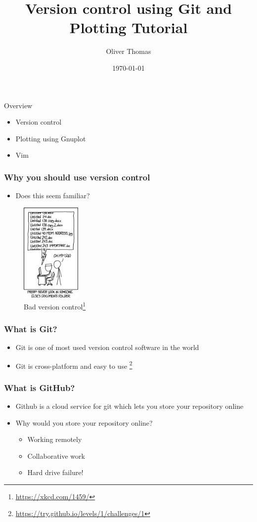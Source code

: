\documentclass{beamer}
\title{Version control using Git and Plotting Tutorial}
\author{Oliver Thomas}
\institute{Quantum Engineering CDT \\ University of Bristol}
\date{\today}
\begin{document}
\frame{\titlepage}



\begin{frame}{Overview}


\begin{itemize}
        \item Version control
        \item Plotting using Gnuplot
        \item Vim
    \end{itemize}
\end{frame}

\begin{frame}
\frametitle{Why you should use version control}
\begin{itemize}
	\item Does this seem familiar? 
\end{itemize}

\begin{figure}[H]
	\centering
	\includegraphics[width=0.26\textwidth]{xkcdversion.png}
	\caption{Bad version control\footnote{\url{https://xkcd.com/1459/}}}
	\label{fig:xkcdversion}
\end{figure}
\end{frame}

\begin{frame}
\frametitle{What is Git?}
\begin{itemize}
\item Git is one of most used version control software in the world 
\item Git is cross-platform and easy to use \footnote{\url{https://try.github.io/levels/1/challenges/1}}
\end{itemize}
\end{frame}

\begin{frame}
\frametitle{What is GitHub?}
\begin{itemize} 
\item Github is a cloud service for git which lets you store your repository online
\item Why would you store your repository online?
\begin{itemize}
\item Working remotely
\item Collaborative work  
\item Hard drive failure!
\end{itemize}
\end{itemize}
\end{frame}
\end{document}

